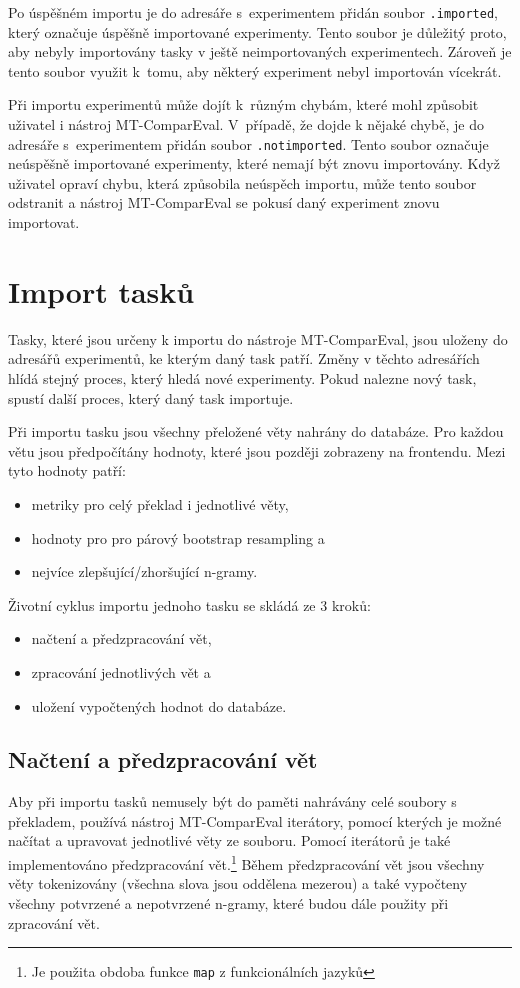 Po úspěšném importu je do adresáře s~experimentem přidán soubor \texttt{.imported},
  který označuje úspěšně importované experimenty.
Tento soubor je důležitý proto,
  aby nebyly importovány tasky v ještě neimportovaných experimentech.
Zároveň  je tento soubor využit k~tomu,
  aby některý experiment nebyl importován vícekrát.

Při importu experimentů může dojít k~různým chybám,
  které mohl způsobit uživatel i nástroj \mbox{MT-ComparEval}.
V~případě, že dojde k nějaké chybě,
  je do adresáře s~experimentem přidán soubor \texttt{.notimported}.
Tento soubor označuje neúspěšně importované experimenty, 
  které nemají být znovu importovány.
Když uživatel opraví chybu,
  která způsobila neúspěch importu,
  může tento soubor odstranit
  a nástroj \mbox{MT-ComparEval} se pokusí daný experiment znovu importovat.


\section{Import tasků}
Tasky, které jsou určeny k importu do nástroje \mbox{MT-ComparEval},
  jsou uloženy do adresářů experimentů,
  ke kterým daný task patří.
Změny v těchto adresářích hlídá stejný proces,
  který hledá nové experimenty.
Pokud nalezne nový task,
  spustí další proces,
  který daný task importuje.

Při importu tasku jsou všechny přeložené věty nahrány do databáze.
Pro každou větu jsou předpočítány hodnoty,
  které jsou později zobrazeny na frontendu.
Mezi tyto hodnoty patří:
\begin{itemize}
	\item metriky pro celý překlad i jednotlivé věty,
	\item hodnoty pro pro párový bootstrap resampling a
	\item nejvíce zlepšující/zhoršující \mbox{n-gramy}.
\end{itemize}

Životní cyklus importu jednoho tasku se skládá ze 3 kroků:
\begin{itemize}
	\item načtení a předzpracování vět,
	\item zpracování jednotlivých vět a
	\item uložení vypočtených hodnot do databáze.
\end{itemize}

\subsection{Načtení a předzpracování vět}
Aby při importu tasků nemusely být do paměti nahrávány celé soubory s překladem,
  používá nástroj \mbox{MT-ComparEval} iterátory,
  pomocí kterých je možné načítat a upravovat jednotlivé věty ze souboru.
Pomocí iterátorů je také implementováno předzpracování vět.\footnote{Je použita obdoba funkce \texttt{map} z funkcionálních jazyků}
Během předzpracování vět jsou všechny věty tokenizovány (všechna slova jsou oddělena mezerou) a
také vypočteny všechny potvrzené a nepotvrzené \mbox{n-gramy},
  které budou dále použity při zpracování vět.

